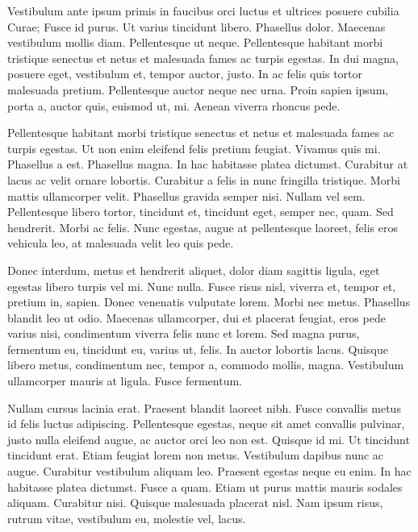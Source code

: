 Vestibulum ante ipsum primis in faucibus orci luctus et ultrices posuere
cubilia Curae; Fusce id purus. Ut varius tincidunt libero. Phasellus dolor.
Maecenas vestibulum mollis diam. Pellentesque ut neque. Pellentesque habitant
morbi tristique senectus et netus et malesuada fames ac turpis egestas. In dui
magna, posuere eget, vestibulum et, tempor auctor, justo. In ac felis quis
tortor malesuada pretium. Pellentesque auctor neque nec urna. Proin sapien
ipsum, porta a, auctor quis, euismod ut, mi. Aenean viverra rhoncus pede.

Pellentesque habitant morbi tristique senectus et netus et malesuada fames ac
turpis egestas. Ut non enim eleifend felis pretium feugiat. Vivamus quis mi.
Phasellus a est. Phasellus magna. In hac habitasse platea dictumst. Curabitur
at lacus ac velit ornare lobortis. Curabitur a felis in nunc fringilla
tristique. Morbi mattis ullamcorper velit. Phasellus gravida semper nisi.
Nullam vel sem. Pellentesque libero tortor, tincidunt et, tincidunt eget,
semper nec, quam. Sed hendrerit. Morbi ac felis. Nunc egestas, augue at
pellentesque laoreet, felis eros vehicula leo, at malesuada velit leo quis
pede.

Donec interdum, metus et hendrerit aliquet, dolor diam sagittis ligula, eget
egestas libero turpis vel mi. Nunc nulla. Fusce risus nisl, viverra et, tempor
et, pretium in, sapien. Donec venenatis vulputate lorem. Morbi nec metus.
Phasellus blandit leo ut odio. Maecenas ullamcorper, dui et placerat feugiat,
eros pede varius nisi, condimentum viverra felis nunc et lorem. Sed magna
purus, fermentum eu, tincidunt eu, varius ut, felis. In auctor lobortis lacus.
Quisque libero metus, condimentum nec, tempor a, commodo mollis, magna.
Vestibulum ullamcorper mauris at ligula. Fusce fermentum.

Nullam cursus lacinia erat. Praesent blandit laoreet nibh. Fusce convallis
metus id felis luctus adipiscing. Pellentesque egestas, neque sit amet
convallis pulvinar, justo nulla eleifend augue, ac auctor orci leo non est.
Quisque id mi. Ut tincidunt tincidunt erat. Etiam feugiat lorem non metus.
Vestibulum dapibus nunc ac augue. Curabitur vestibulum aliquam leo. Praesent
egestas neque eu enim. In hac habitasse platea dictumst. Fusce a quam. Etiam ut
purus mattis mauris sodales aliquam. Curabitur nisi. Quisque malesuada placerat
nisl. Nam ipsum risus, rutrum vitae, vestibulum eu, molestie vel, lacus.

